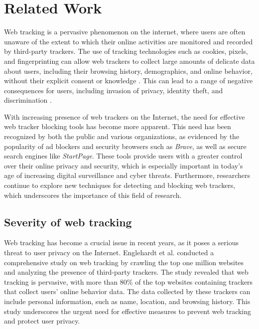 \chapter{Related Work}
\label{cha:relatedwork}

Web tracking is a pervasive phenomenon on the internet, where users are 
often unaware of the extent to which their online activities are monitored
and recorded by third-party trackers. The use of tracking technologies such
as cookies, pixels, and fingerprinting can allow web trackers to collect large 
amounts of delicate data about users, including their browsing history,
demographics, and online behavior, without their explicit consent or knowledge 
\cite{englehardt2016online,hoofnagle2010different}. This can lead to a range of
negative consequences for users, including invasion of privacy, identity theft,
and discrimination \cite{hannak2013measuring,narayanan2010myths}.

With increasing presence of web trackers on the Internet, the need for effective
web tracker blocking tools has become more apparent. This need has been recognized
by both the public and various organizations, as evidenced by the popularity of ad
blockers and security browsers such as \textit{Brave}, as well as secure search engines
like \textit{StartPage}. These tools provide users with a greater control over their
online privacy and security, which is especially important in today's age of increasing
digital surveillance and cyber threats. Furthermore, researchers continue to explore
new techniques for detecting and blocking web trackers, which underscores the importance
of this field of research.

\section{Severity of web tracking} 

Web tracking has become a crucial issue in recent years, as it poses 
a serious threat to user privacy on the Internet. Englehardt et al. \cite{englehardt2016online}
conducted a comprehensive study on web tracking by crawling the top one
million websites and analyzing the presence of third-party trackers.
The study revealed that web tracking is pervasive, with more than 80\%
of the top websites containing trackers that collect users' online
behavior data. The data collected by these trackers can include personal
information, such as name, location, and browsing history. This study
underscores the urgent need for effective measures to prevent web
tracking and protect user privacy.

